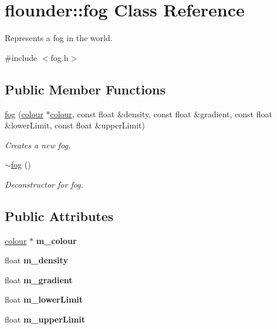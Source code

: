 \hypertarget{classflounder_1_1fog}{}\section{flounder\+:\+:fog Class Reference}
\label{classflounder_1_1fog}


Represents a fog in the world.  




{\ttfamily \#include $<$fog.\+h$>$}

\subsection*{Public Member Functions}
\begin{DoxyCompactItemize}
\item 
\hyperlink{classflounder_1_1fog_ae55a228dc40e89b3ab5077c81a7d1281}{fog} (\hyperlink{classflounder_1_1colour}{colour} $\ast$\hyperlink{classflounder_1_1colour}{colour}, const float \&density, const float \&gradient, const float \&lower\+Limit, const float \&upper\+Limit)
\begin{DoxyCompactList}\small\item\em Creates a new fog. \end{DoxyCompactList}\item 
\hyperlink{classflounder_1_1fog_a5fd83dbbf10b9e34e105d7228f120385}{$\sim$fog} ()
\begin{DoxyCompactList}\small\item\em Deconstructor for fog. \end{DoxyCompactList}\end{DoxyCompactItemize}
\subsection*{Public Attributes}
\begin{DoxyCompactItemize}
\item 
\mbox{\label{classflounder_1_1fog_a889af793a121883c43f2107d8f2a66b3}} 
\hyperlink{classflounder_1_1colour}{colour} $\ast$ {\bfseries m\+\_\+colour}
\item 
\mbox{\label{classflounder_1_1fog_af3e50def83a9f13a8dd0d9845cebea97}} 
float {\bfseries m\+\_\+density}
\item 
\mbox{\label{classflounder_1_1fog_ad3b1798fccaf2bdae60206f8570c8a53}} 
float {\bfseries m\+\_\+gradient}
\item 
\mbox{\label{classflounder_1_1fog_ae175085f095ea7191f5f10b5827898d1}} 
float {\bfseries m\+\_\+lower\+Limit}
\item 
\mbox{\label{classflounder_1_1fog_a9b229b1c0ce64aae00d7d4fe13f27ae9}} 
float {\bfseries m\+\_\+upper\+Limit}
\end{DoxyCompactItemize}



